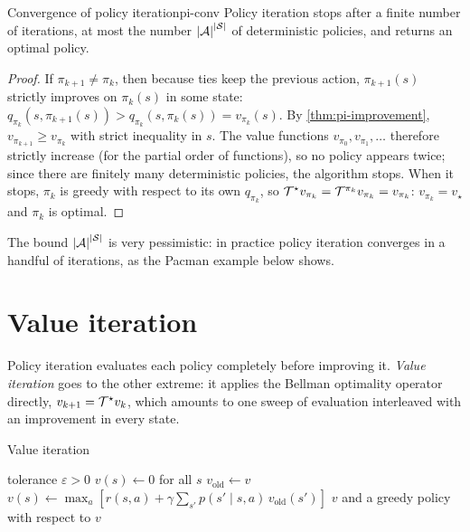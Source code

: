 \begin{theorem}{Convergence of policy iteration}{pi-conv}
  Policy iteration stops after a finite number of iterations, at most the
  number $\left\lvert \mathcal{A} \right\rvert^{\left\lvert \mathcal{S} \right\rvert}$ of deterministic policies, and
  returns an optimal policy.
\end{theorem}

\begin{proof}
  If $\pi_{k+1} \neq \pi_k$, then because ties keep the previous action,
  $\pi_{k+1}(s)$ strictly improves on $\pi_k(s)$ in some state:
  $q_{\pi_k}(s, \pi_{k+1}(s)) > q_{\pi_k}(s, \pi_k(s)) = v_{\pi_k}(s)$. By
  \cref{thm:pi-improvement}, $v_{\pi_{k+1}} \geq v_{\pi_k}$ with strict
  inequality in $s$. The value functions $v_{\pi_0}, v_{\pi_1}, \dots$
  therefore strictly increase (for the partial order of functions), so no
  policy appears twice; since there are finitely many deterministic
  policies, the algorithm stops. When it stops, $\pi_k$ is greedy with
  respect to its own $q_{\pi_k}$, so $\mathcal{T}^\star v_{\pi_k} = \mathcal{T}^{\pi_k}
  v_{\pi_k} = v_{\pi_k}$: $v_{\pi_k} = v_\star$ and $\pi_k$ is optimal.
\end{proof}

The bound $\left\lvert \mathcal{A} \right\rvert^{\left\lvert \mathcal{S} \right\rvert}$ is very pessimistic: in practice
policy iteration converges in a handful of iterations, as the Pacman example
below shows.

\section{Value iteration}

Policy iteration evaluates each policy completely before improving it.
\emph{Value iteration} goes to the other extreme: it applies the Bellman
optimality operator directly, $v_{k+1} = \mathcal{T}^\star v_k$, which amounts to
one sweep of evaluation interleaved with an improvement in every state.

\begin{algobox}{Value iteration}
  \begin{algorithmic}[1]
    \Require tolerance $\varepsilon > 0$
    \State $v(s) \gets 0$ for all $s$
    \Repeat
      \State $v_{\text{old}} \gets v$
        \State $v(s) \gets \max_a \left[ r(s, a) + \gamma \sum_{s'}
          p(s' \mid s, a)\, v_{\text{old}}(s') \right]$
      \EndFor
    \State \Return $v$ and a greedy policy with respect to $v$
  \end{algorithmic}
\end{algobox}

